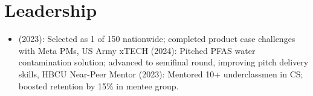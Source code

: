 \documentclass[12pt]{article} %
\begin{document}
\section{Leadership}
\begin{itemize}
  \item (2023): Selected as 1 of 150 nationwide; completed product case challenges with Meta PMs,
US Army xTECH (2024): Pitched PFAS water contamination solution; advanced to semifinal round, improving pitch delivery skills,
HBCU Near-Peer Mentor (2023): Mentored 10+ underclassmen in CS; boosted retention by 15\% in mentee group.
\end{itemize}
\end{document}
